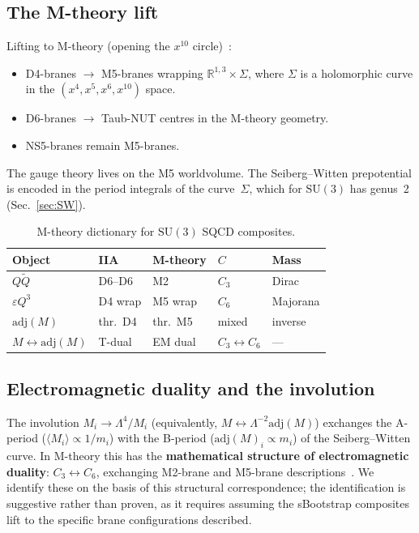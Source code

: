\documentclass[aps,prd,twocolumn,showpacs,preprintnumbers,superscriptaddress,floatfix]{revtex4-2}
\newcommand{\SU}{\mathrm{SU}}
\newcommand{\adj}{\mathrm{adj}}
\begin{document}
\subsection{The M-theory lift}

Lifting to M-theory (opening the $x^{10}$
circle)~\cite{Witten:1997sc,Townsend:1995}:
\begin{itemize}
  \item D4-branes $\to$ M5-branes wrapping
    $\mathbb{R}^{1,3} \times \Sigma$, where $\Sigma$ is a
    holomorphic curve in the
    $(x^4, x^5, x^6, x^{10})$ space.
  \item D6-branes $\to$ Taub-NUT centres in the M-theory
    geometry.
  \item NS5-branes remain M5-branes.
\end{itemize}
The gauge theory lives on the M5 worldvolume.
The Seiberg--Witten prepotential is encoded in the period
integrals of the curve~$\Sigma$, which for $\SU(3)$ has genus~2
(Sec.~\ref{sec:SW}).

\begin{table}
\centering\footnotesize
\caption{M-theory dictionary for $\SU(3)$ SQCD composites.}
\label{tab:Mtheory}
\begin{tabular}{@{}lllll@{}}
\hline
Object & IIA & M-theory & $C$ & Mass \\
\hline
$Q\tilde{Q}$ & D6--D6 & M2 & $C_3$ & Dirac \\
$\varepsilon Q^3$ & D4 wrap & M5 wrap & $C_6$ & Majorana \\
$\adj(M)$ & thr.\ D4 & thr.\ M5 & mixed & inverse \\
$M\!\leftrightarrow\!\adj(M)$ & T-dual & EM dual & $C_3\!\leftrightarrow\!C_6$ & --- \\
\hline
\end{tabular}
\end{table}


\subsection{Electromagnetic duality and the involution}

The involution $M_i \to \Lambda^4/M_i$
(equivalently, $M \leftrightarrow \Lambda^{-2}\adj(M)$) exchanges the
A-period ($\langle M_i\rangle \propto 1/m_i$) with the B-period
($\adj(M)_i \propto m_i$) of the Seiberg--Witten curve.
In M-theory this has the \textbf{mathematical structure of
electromagnetic duality}: $C_3 \leftrightarrow C_6$, exchanging
M2-brane and M5-brane
descriptions~\cite{Schwarz:1995,Strominger:1995}.
We identify these on the basis of this structural
correspondence; the identification is suggestive rather than
proven, as it requires assuming the sBootstrap composites lift
to the specific brane configurations described.
\end{document}
